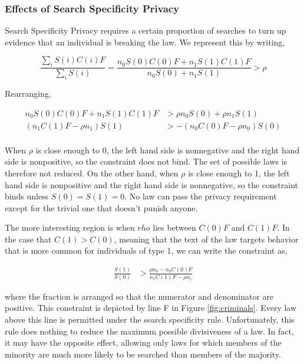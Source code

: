 \subsubsection{Effects of Search Specificity Privacy}

Search Specificity Privacy requires a certain proportion of searches to turn up evidence that an individual is breaking the law.  We represent this by writing,

$$\frac{\sum_i S(i)C(i)F}{\sum_i S(i)} = \frac{ n_0 S(0)C(0)F + n_1 S(1)C(1)F}{n_0 S(0) + n_1 S(1)}  > \rho$$

Rearranging,

\begin{align}
\nonumber n_0 S(0)C(0)F + n_1 S(1)C(1)F &> \rho n_0 S(0) + \rho n_1 S(1) \\
\nonumber  (n_1 C(1)F - \rho n_1 ) S(1) &>  - (n_0 C(0)F - \rho n_0 )S(0) \\
\end{align}

When $\rho$ is close enough to 0, the left hand side is nonnegative and the right hand side is nonpositive, so the constraint does not bind.  The set of possible laws is therefore not reduced.  On the other hand, when $\rho$ is close enough to 1, the left hand side is nonpositive and the right hand side is nonnegative, so the constraint binds unless $S(0) = S(1) = 0$.  No law can pass the privacy requirement except for the trivial one that doesn't punish anyone.  

The more interesting region is when $rho$ lies between  $C(0)F$ and $C(1)F$.  In the case that $C(1) > C(0)$, meaning that the text of the law targets behavior that is more common for individuals of type 1, we can write the constraint as,

\begin{align}
\frac{S(1)}{S(0)} &>  \frac{\rho n_0 - n_0 C(0)F }{n_1 C(1)F - \rho n_1}
\end{align}

where the fraction is arranged so that the numerator and denominator are positive.  This constraint is depicted by line F in Figure \ref{fig:criminals}.  Every law above this line is permitted under the search specificity rule.  Unfortunately, this rule does nothing to reduce the maximum possible divisiveness of a law.  In fact, it may have the opposite effect, allowing only laws for which members of the minority are much more likely to be searched than members of the majority.

